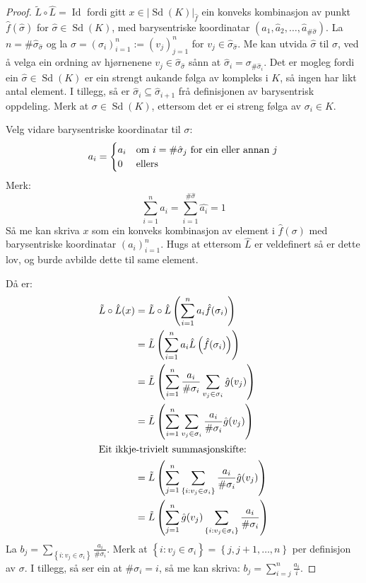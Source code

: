 \documentclass[a4paper, 12pt, norsk]{article}
\theoremstyle{plain}
\theoremstyle{definition}
\newcommand{\gr}[1]{ \lvert #1 \rvert } %
\newcommand{\set}[1]{ \left \{ #1 \right \} } %
\newcommand{\tuple}[1]{ \left( #1 \right) } %
\DeclareMathOperator{\Sd}{Sd}
\DeclareMathOperator{\Id}{Id}
\begin{document}
\begin{proof}
	\( \tilde{L}\circ\hat{L} = \Id \) fordi gitt \( x \in \gr{\Sd(K)}_{\hat{f}} \) ein konveks kombinasjon av punkt \( \hat{f}(\hat{\sigma}) \) for \( \hat{\sigma} \in \Sd(K) \), med barysentriske koordinatar \( \tuple{\hat{a}_1, \hat{a}_2, \dots, \hat{a}_{\#\hat{\sigma}}} \). La \( n = \#\hat{\sigma}_{\hat{\sigma}} \) og la \( \sigma = \tuple{\sigma_i}_{i=1}^{n} := \tuple{v_j}_{j=1}^{n} \) for \( v_j \in \hat{\sigma}_{\hat{\sigma}} \). Me kan utvida \( \hat{\sigma} \) til \( \sigma \), ved å velga ein ordning av hjørnenene \( v_j \in \hat{\sigma}_{\hat{\sigma}} \) sånn at \( \hat{\sigma}_i = \sigma_{\#\hat{\sigma}_i} \). Det er mogleg fordi ein \( \hat{\sigma} \in \Sd(K) \) er ein strengt aukande følga av kompleks i \( K \), så ingen har likt antal element. I tillegg, så er \( \hat{\sigma}_i \subseteq \hat{\sigma}_{i+1} \) frå definisjonen av barysentrisk oppdeling. Merk at \( \sigma \in \Sd(K) \), ettersom det er ei streng følga av \( \sigma_i \in K \).

	Velg vidare barysentriske koordinatar til \( \sigma \):
	\[
		a_i =
		\begin{cases}
			a_i & \text{om \( i = \#\hat{\sigma}_j \) for ein eller annan \( j \)} \\
			0 & \text{ellers}
		\end{cases}
	\]
	Merk:
	\[
		\sum_{i=1}^n a_i = \sum_{i=1}^{\#\hat{\sigma}}\hat{a_i}=1
	\]
	Så me kan skriva \( x \) som ein konveks kombinasjon av element i \( \hat{f}(\sigma) \) med barysentriske koordinatar \( \tuple{a_i}_{i=1}^n \). Hugs at ettersom \( \hat{L} \) er veldefinert så er dette lov, og burde avbilde dette til same element.

	Då er:
	\begin{align*}
		\tilde{L}\circ\hat{L}(x) &= \tilde{L}\circ\hat{L}\tuple{\sum_{i=1}^n a_i \hat{f}(\sigma_i)} \\
		&= \tilde{L}\tuple{\sum_{i=1}^n a_i \hat{L}\tuple{\hat{f}(\sigma_i)}} \\
		&= \tilde{L}\tuple{\sum_{i=1}^n \frac{a_i}{\#\sigma_i}\sum_{v_j \in \sigma_i}\hat{g}(v_j)} \\
		&= \tilde{L}\tuple{\sum_{i=1}^n\sum_{v_j \in \sigma_i}\frac{a_i}{\#\sigma_i}\hat{g}(v_j)} \\
		\intertext{Eit ikkje-trivielt summasjonskifte:}
		&= \tilde{L}\tuple{\sum_{j=1}^n\sum_{\set{i:v_j\in\sigma_i}}\frac{a_i}{\#\sigma_i}\hat{g}(v_j)} \\
		&= \tilde{L}\tuple{\sum_{j=1}^n \hat{g}(v_j) \sum_{\set{i:v_j\in\sigma_i}}\frac{a_i}{\#\sigma_i}}
	\end{align*}
	La \( b_j = \sum_{\set{i:v_j\in\sigma_i}}\frac{a_i}{\#\sigma_i} \). Merk at \( \set{i : v_j \in \sigma_i} = \set{j, j+1, \dots, n } \) per definisjon av \( \sigma \). I tillegg, så ser ein at \( \#\sigma_i = i \), så me kan skriva: \( b_j = \sum_{i=j}^n \frac{a_i}{i} \).


\end{proof}
\end{document}
